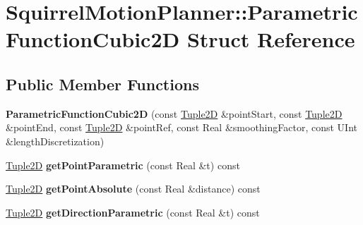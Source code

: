 \hypertarget{structSquirrelMotionPlanner_1_1ParametricFunctionCubic2D}{\section{Squirrel\-Motion\-Planner\-:\-:Parametric\-Function\-Cubic2\-D Struct Reference}
\label{structSquirrelMotionPlanner_1_1ParametricFunctionCubic2D}
}
\subsection*{Public Member Functions}
\begin{DoxyCompactItemize}
\item 
\hypertarget{structSquirrelMotionPlanner_1_1ParametricFunctionCubic2D_a4fb47d221618579799123b6ffcf262ed}{{\bfseries Parametric\-Function\-Cubic2\-D} (const \hyperlink{structSquirrelMotionPlanner_1_1Tuple2D}{Tuple2\-D} \&point\-Start, const \hyperlink{structSquirrelMotionPlanner_1_1Tuple2D}{Tuple2\-D} \&point\-End, const \hyperlink{structSquirrelMotionPlanner_1_1Tuple2D}{Tuple2\-D} \&point\-Ref, const Real \&smoothing\-Factor, const U\-Int \&length\-Discretization)}\label{structSquirrelMotionPlanner_1_1ParametricFunctionCubic2D_a4fb47d221618579799123b6ffcf262ed}

\item 
\hypertarget{structSquirrelMotionPlanner_1_1ParametricFunctionCubic2D_a586ae04118df9771640e10d11c401a7d}{\hyperlink{structSquirrelMotionPlanner_1_1Tuple2D}{Tuple2\-D} {\bfseries get\-Point\-Parametric} (const Real \&t) const }\label{structSquirrelMotionPlanner_1_1ParametricFunctionCubic2D_a586ae04118df9771640e10d11c401a7d}

\item 
\hypertarget{structSquirrelMotionPlanner_1_1ParametricFunctionCubic2D_a9450b164e65a199e289f19e09e1bc39b}{\hyperlink{structSquirrelMotionPlanner_1_1Tuple2D}{Tuple2\-D} {\bfseries get\-Point\-Absolute} (const Real \&distance) const }\label{structSquirrelMotionPlanner_1_1ParametricFunctionCubic2D_a9450b164e65a199e289f19e09e1bc39b}

\item 
\hypertarget{structSquirrelMotionPlanner_1_1ParametricFunctionCubic2D_a40df759c1e443450a0edd8db156070e9}{\hyperlink{structSquirrelMotionPlanner_1_1Tuple2D}{Tuple2\-D} {\bfseries get\-Direction\-Parametric} (const Real \&t) const }\label{structSquirrelMotionPlanner_1_1ParametricFunctionCubic2D_a40df759c1e443450a0edd8db156070e9}


\end{DoxyCompactItemize}
